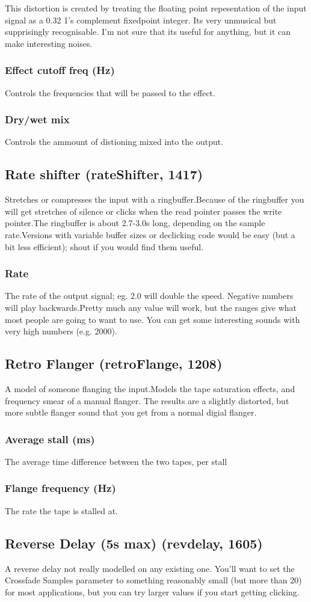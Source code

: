 \documentclass[11pt]{article}
\begin{document}
This distortion is created by treating the floating point repesentation
of the input signal as a 0.32 1's complement fixedpoint integer. Its very
unmusical but supprisingly recognisable. I'm not sure that its useful for
anything, but it can make interesting noises.\subsubsection*{Effect cutoff freq (Hz)}
Controls the frequencies that will be passed to the effect.\subsubsection*{Dry/wet mix}
Controls the ammount of distioning mixed into the output.\subsection{Rate shifter (rateShifter, 1417)\label{rateShifter}\label{id1417}}
Stretches or compresses the input with a ringbuffer.Because of the ringbuffer you will get stretches of silence or clicks when the read pointer passes the write pointer.The ringbuffer is about 2.7-3.0s long, depending on the sample rate.Versions with variable buffer sizes or declicking code would be easy (but a bit less efficient); shout if you would find them useful.\subsubsection*{Rate}
The rate of the output signal; eg. 2.0 will double the speed. Negative numbers will play backwards.Pretty much any value will work, but the ranges give what most people are going to want to use. You can get some interesting sounds with very high numbers (e.g. 2000).\subsection{Retro Flanger (retroFlange, 1208)\label{retroFlange}\label{id1208}}
A model of someone flanging the input.Models the tape saturation effects, and frequency smear of a manual flanger. The results are a slightly distorted, but more subtle flanger sound that you get from a normal digial flanger.\subsubsection*{Average stall (ms)}
The average time difference between the two tapes, per stall\subsubsection*{Flange frequency (Hz)}
The rate the tape is stalled at.\subsection{Reverse Delay (5s max) (revdelay, 1605)\label{revdelay}\label{id1605}}
 A reverse delay not really modelled on any existing one.  You'll want to set
         the Crossfade Samples parameter to something reasonably small (but more than 20)
         for most applications, but you can try larger values if you start getting clicking.
\end{document}
